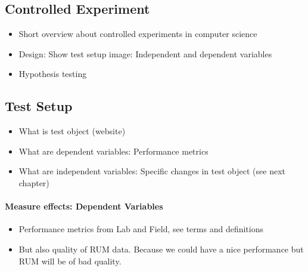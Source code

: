 






\subsection{Controlled Experiment}

\begin{itemize}
\item Short overview about controlled experiments in computer science
\item Design: Show test setup image: Independent and dependent variables
\item Hypothesis testing
\end{itemize}









\subsection{Test Setup}

\begin{itemize}
\item What is test object (website)
\item What are dependent variables: Performance metrics
\item What are independent variables: Specific changes in test object (see next chapter)
\end{itemize}


\paragraph{Measure effects: Dependent Variables}

\begin{itemize}
\item Performance metrics from Lab and Field, see terms and definitions
\item But also quality of RUM data. Because we could have a nice performance but RUM will be of bad quality. 
\end{itemize}


